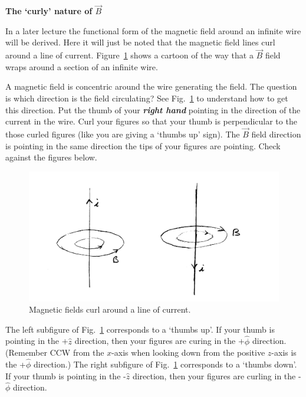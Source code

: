 \documentclass[12pt]{article}
\begin{document}
\begin{flushleft}
{\bf The `curly' nature of $\vec{B}$}\\
\vspace{.2in}

In a later lecture the functional form of the magnetic field around an infinite wire will be derived.  Here it will just be noted that the magnetic field lines curl around a line of current.  Figure~\ref{fig:bwire} shows a cartoon of the way that a $\vec{B}$ field wraps around a section of an infinite wire.

A magnetic field is concentric around the wire generating the field.  The question is which direction is the field circulating?  See Fig.~\ref{fig:bwire} to understand how to get this direction.  Put the thumb of your {\bf \textit{right hand}} pointing in the direction of the current in the wire.  Curl your figures so that your thumb is perpendicular to the those curled figures (like you are giving a `thumbs up' sign).  The $\vec{B}$ field direction is pointing in the same direction the tips of your figures are pointing.  Check against the figures below.

\begin{figure}[h]
\centering
\includegraphics*[trim=1cm 1cm 1cm .5cm, clip=true, width=0.6\columnwidth]{B_longwires.png}
\caption{\small Magnetic fields curl around a line of current.}
\label{fig:bwire}
\end{figure}

The left subfigure of Fig.~\ref{fig:bwire} corresponds to a `thumbs up'.  If your thumb is pointing in the +$\hat{z}$ direction, then your figures are curing in the +$\hat{\phi}$ direction.  (Remember CCW from the $x$-axis when looking down from the positive $z$-axis is the  +$\hat{\phi}$ direction.)  The right subfigure of Fig.~\ref{fig:bwire} corresponds to a `thumbs down'.  If your thumb is pointing in the -$\hat{z}$ direction, then your figures are curling in the -$\hat{\phi}$ direction.
\end{flushleft}
\end{document}
